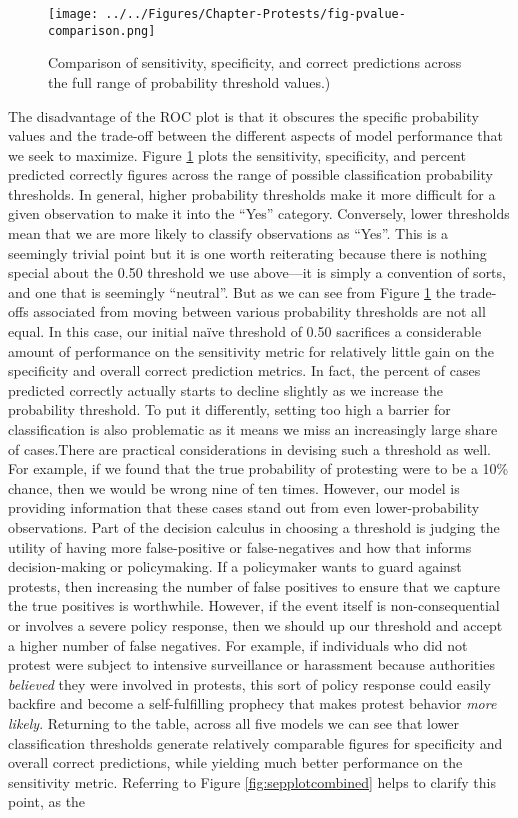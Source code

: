 \begin{figure}[t]
	\centering\texttt{[image: ../../Figures/Chapter-Protests/fig-pvalue-comparison.png]}
	\caption{Comparison of sensitivity, specificity, and correct predictions across the full range of probability threshold values.)}
	\label{fig:protest-pvalue-compare}
\end{figure}

The disadvantage of the ROC plot is that it obscures the specific probability values and the trade-off between the different aspects of model performance that we seek to maximize. Figure \ref{fig:protest-pvalue-compare} plots the sensitivity, specificity, and percent predicted correctly figures across the range of possible classification probability thresholds. In general, higher probability thresholds make it more difficult for a given observation to make it into the ``Yes'' category. Conversely, lower thresholds mean that we are more likely to classify observations as ``Yes''. This is a seemingly trivial point but it is one worth reiterating because there is nothing special about the 0.50 threshold we use above---it is simply a convention of sorts, and one that is seemingly ``neutral''. But as we can see from Figure \ref{fig:protest-pvalue-compare} the trade-offs associated from moving between various probability thresholds are not all equal. In this case, our initial na\"{i}ve threshold of 0.50 sacrifices a considerable amount of performance on the sensitivity metric for relatively little gain on the specificity and overall correct prediction metrics. In fact, the percent of cases predicted correctly actually starts to decline slightly as we increase the probability threshold. To put it differently, setting too high a barrier for classification is also problematic as it means we miss an increasingly large share of cases.There are practical considerations in devising such a threshold as well. For example, if we found that the true probability of protesting were to be a 10\% chance, then we would be wrong nine of ten times. However, our model is providing information that these cases stand out from even lower-probability observations. Part of the decision calculus in choosing a threshold is judging the utility of having more false-positive or false-negatives and how that informs decision-making or policymaking. If a policymaker wants to guard against protests, then increasing the number of false positives to ensure that we capture the true positives is worthwhile. However, if the event itself is non-consequential or involves a severe policy response, then we should up our threshold and accept a higher number of false negatives. For example, if individuals who did not protest were subject to intensive surveillance or harassment because authorities \textit{believed} they were involved in protests, this sort of policy response could easily backfire and become a self-fulfilling prophecy that makes protest behavior \textit{more likely}. Returning to the table, across all five models we can see that lower classification thresholds generate relatively comparable figures for specificity and overall correct predictions, while yielding much better performance on the sensitivity metric. Referring to Figure \ref{fig:sepplotcombined} helps to clarify this point, as the 